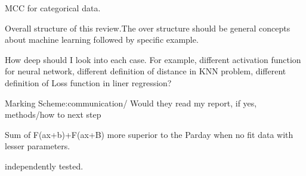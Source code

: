 \documentclass[12pt,a4paper]{article}
\begin{document}
MCC for categorical data.
\begin{example}
    {Overall structure of this review.}{The over structure should be general concepts about machine learning followed by specific example.}
\end{example}
\begin{example}
    {How deep should I look into each case. For example, different activation function for neural network, different definition of distance in KNN problem, different definition of Loss function in liner regression?}{}
\end{example}
\begin{example}
    {Marking Scheme:}{communication/ Would they read my report, if yes, methods/how to next step}
\end{example}


Sum of F(ax+b)+F(ax+B) more superior to the Parday when no fit data with lesser parameters.




independently tested.
\end{document}
